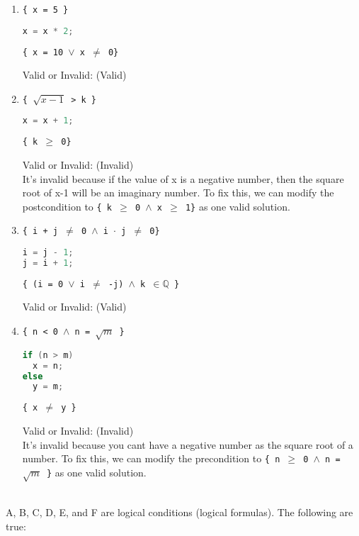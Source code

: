 \documentclass[11pt]{article}
\begin{document}
\begin{enumerate}
\item \texttt{\{ x = 5 \}}
\begin{lstlisting}[language=java,basicstyle=\ttfamily]
x = x * 2;
\end{lstlisting}
\texttt{\{ x = 10 $\lor$ x $\neq$ 0\}}

Valid or Invalid: (Valid)

\item \texttt{\{ $\sqrt{x-1}$ > k \}}
\begin{lstlisting}[language=java,basicstyle=\ttfamily]
x = x + 1;
\end{lstlisting}
\texttt{\{ k $\geq$ 0\}}

Valid or Invalid: (Invalid)\\
It's invalid because if the value of x is a negative number, then the square root of x-1 will be an imaginary number. To fix this, we can modify the postcondition to \texttt{\{ k $\geq$ 0 $\land$ x $\geq$ 1\}} as one valid solution.

\item \texttt{\{ i + j $\neq$ 0 $\land$ i $\cdot$ j $\neq$ 0\}}
\begin{lstlisting}[language=java,basicstyle=\ttfamily]
i = j - 1;
j = i + 1;
\end{lstlisting}
\texttt{\{ (i = 0 $\lor$ i $\neq$ -j) $\land$ k $\in \mathbb{Q}$ \}}

Valid or Invalid: (Valid)

\item \texttt{\{ n < 0 $\land$ n = $\sqrt{m}$ \}}
\begin{lstlisting}[language=java,basicstyle=\ttfamily]
if (n > m)
  x = n;
else
  y = m;
\end{lstlisting}
\texttt{\{ x $\neq$ y \}}

Valid or Invalid: (Invalid)\\
It's invalid because you cant have a negative number as the square root of a number. To fix this, we can modify the precondition to \texttt{\{ n $\geq$ 0 $\land$ n = $\sqrt{m}$ \}} as one valid solution.
\end{enumerate}

\newpage

 \\

A, B, C, D, E, and F are logical conditions (logical formulas). The following are true:
\end{document}
